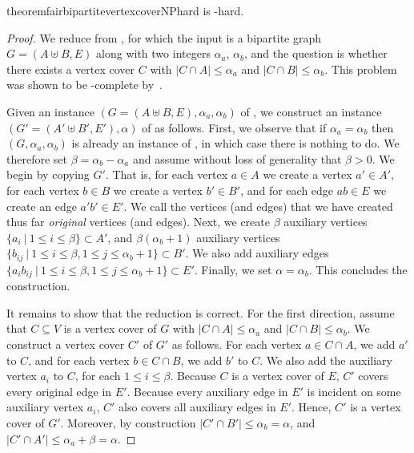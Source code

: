 %
\begin{restatable}{theorem}{fairbipartitevertexcoverNPhard}\label{thm:fairbipartiteVC-NPhard}
    \fairbipartiteVC{} is -hard.
\end{restatable}
\begin{proof}
    We reduce from \constrainedbipartiteVC{}, for which the input is a bipartite graph $G = (A \uplus B, E)$ along with two integers $\alpha_a$, $\alpha_b$, and the question is whether there exists a vertex cover $C$ with $|C \cap A| \leq \alpha_a$ and $|C \cap B| \leq \alpha_b$.
    This problem was shown to be -complete by~\citet{kuo1987efficient}.

    Given an instance $(G = (A \uplus B, E), \alpha_a, \alpha_b)$ of \constrainedbipartiteVC{}, we construct an instance $(G' = (A' \uplus B', E'), \alpha)$ of \fairbipartiteVC{} as follows.
    First, we observe that if $\alpha_a = \alpha_b$ then $(G, \alpha_a, \alpha_b)$ is already an instance of \fairbipartiteVC{}, in which case there is nothing to do.
    We therefore set $\beta = \alpha_b - \alpha_a$ and assume without loss of generality that $\beta > 0$.
    We begin by copying $G'$. That is, for each vertex $a \in A$ we create a vertex $a' \in A'$, for each vertex $b \in B$ we create a vertex $b' \in B'$, and for each edge $ab \in E$ we create an edge $a'b' \in E'$. We call
    the vertices (and edges) that we have created thus far \emph{original} vertices (and edges).
    Next, we create $\beta$ auxiliary vertices $\{a_i \ | \ 1 \leq i \leq \beta \} \subset A'$, and $\beta(\alpha_b + 1)$ auxiliary vertices $\{ b_{ij} \ | \ 1 \leq i \leq \beta, 1 \leq j \leq \alpha_b + 1 \} \subset B'$.
    We also add auxiliary edges $\{a_ib_{ij} \ | \ 1 \leq i \leq \beta, 1 \leq j \leq \alpha_b + 1 \} \subset E'$. Finally, we set $\alpha = \alpha_b$. This concludes the construction.

    It remains to show that the reduction is correct. For the first direction, assume that $C \subseteq V$ is a vertex cover of $G$ with $|C \cap A| \leq \alpha_a$ and $|C \cap B| \leq \alpha_b$.
    We construct a vertex cover $C'$ of $G'$ as follows. For each vertex $a \in C \cap A$, we add $a'$ to $C$, and for each vertex $b \in C \cap B$, we add $b'$ to $C$. We also add the auxiliary vertex $a_i$ to $C$, for each $1 \leq i \leq \beta$.
    Because $C$ is a vertex cover of $E$, $C'$ covers every original edge in $E'$. Because every auxiliary edge in $E'$ is incident on some auxiliary vertex $a_i$, $C'$ also covers all auxiliary edges in $E'$.
    Hence, $C'$ is a vertex cover of $G'$. Moreover, by construction $|C' \cap B'| \leq \alpha_b = \alpha$, and $|C' \cap A'| \leq \alpha_a + \beta = \alpha$.


\end{proof}
